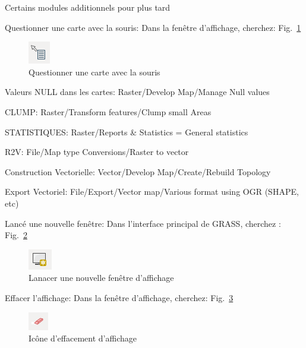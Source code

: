 Certains modules additionnels pour plus tard

Questionner une carte avec la souris:   
Dans la fen\^etre d'affichage, cherchez:   Fig.~\ref{fig:grass017}

\begin{figure}[htbp]
   \centering
   \includegraphics[scale=1]{grass017.png}
   \caption{Questionner une carte avec la souris}
   \label{fig:grass017}
\end{figure}

Valeurs NULL dans les cartes: Raster/Develop Map/Manage Null values

CLUMP: Raster/Transform features/Clump small Areas

STATISTIQUES: Raster/Reports \& Statistics = General statistics

R2V: File/Map type Conversions/Raster to vector

Construction Vectorielle: Vector/Develop Map/Create/Rebuild Topology

Export Vectoriel: File/Export/Vector map/Various format using OGR (SHAPE, etc)

Lanc\'e une nouvelle fen\^etre:
Dans l'interface principal de GRASS, cherchez :    Fig.~\ref{fig:grass018}

\begin{figure}[htbp]
   \centering
   \includegraphics[scale=1]{grass018.png}
   \caption{Lanacer une nouvelle fen\^etre d'affichage}
   \label{fig:grass018}
\end{figure}

Effacer l'affichage:
Dans la fen\^etre d'affichage, cherchez:   Fig.~\ref{fig:grass019}

\begin{figure}[htbp]
   \centering
   \includegraphics[scale=1]{grass019.png}
   \caption{Ic\^one d'effacement d'affichage}
   \label{fig:grass019}
\end{figure}

